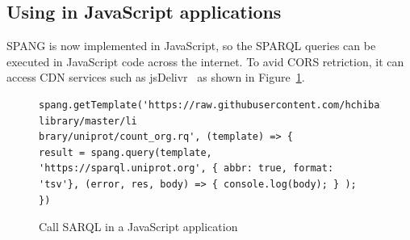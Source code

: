 \documentclass[runningheads]{llncs}
\begin{document}
\subsection{Using in JavaScript applications}
SPANG is now implemented in JavaScript, so the SPARQL queries can be executed in JavaScript code across the internet. To avid CORS retriction, it can access CDN services such as jsDelivr~\cite{jsdelivr} as shown in Figure~\ref{fig:jsdelivr}.



\begin{figure}[!t]
\begin{scriptsize}
\begin{verbatim}
spang.getTemplate('https://raw.githubusercontent.com/hchiba1/spang-library/master/li
brary/uniprot/count_org.rq', (template) => {
result = spang.query(template, 'https://sparql.uniprot.org', { abbr: true, format:
'tsv'}, (error, res, body) => { console.log(body); } );
})
\end{verbatim}
\end{scriptsize}
\caption{Call SARQL in a JavaScript application}
\label{fig:jsdelivr}
\end{figure}





\end{document}
